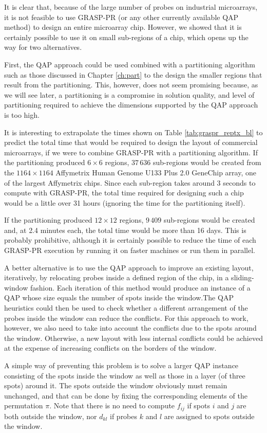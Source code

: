 It is clear that, because of the large number of probes on industrial
microarrays, it is not feasible to use GRASP-PR (or any other currently
available QAP method) to design an entire microarray chip. However, we showed
that it is certainly possible to use it on small sub-regions of a chip, which
opens up the way for two alternatives.

First, the QAP approach could be used combined with a partitioning algorithm
such as those discussed in Chapter \ref{ch:part} to the design the smaller
regions that result from the partitioning. This, however, does not seem
promising because, as we will see later, a partitioning is a compromise in
solution quality, and level of partitioning required to achieve the dimensions
supported by the QAP approach is too high.

It is interesting to extrapolate the times shown on Table
\ref{tab:graspr_reptx_bl} to predict the total time that would be required to
design the layout of commercial microarrays, if we were to combine GRASP-PR with
a partitioning algorithm. If the partitioning produced $6\times 6$ regions,
$37\,636$ sub-regions would be created from the $1164\times 1164$ Affymetrix
Human Genome U133 Plus 2.0 GeneChip array, one of the largest Affymetrix chips.
Since each sub-region takes around 3 seconds to compute with GRASP-PR, the total
time required for designing such a chip would be a little over 31 hours
(ignoring the time for the partitioning itself).

If the partitioning produced $12\times 12$ regions, $9\,409$ sub-regions would
be created and, at 2.4 minutes each, the total time would be more than 16 days.
This is probably prohibitive, although it is certainly possible to reduce the
time of each GRASP-PR execution by running it on faster machines or run them in
parallel.

A better alternative is to use the QAP approach to improve an existing layout,
iteratively, by relocating probes inside a defined region of the chip, in a
sliding-window fashion. Each iteration of this method would produce an instance
of a QAP whose size equals the number of spots inside the window.The QAP
heuristics could then be used to check whether a different arrangement of the
probes inside the window can reduce the conflicts. For this approach to work,
however, we also need to take into account the conflicts due to the spots around
the window. Otherwise, a new layout with less internal conflicts could be
achieved at the expense of increasing conflicts on the borders of the window.

A simple way of preventing this problem is to solve a larger QAP instance
consisting of the spots inside the window as well as those in a layer (of three
spots) around it. The spots outside the window obviously must remain unchanged,
and that can be done by fixing the corresponding elements of the permutation
$\pi$. Note that there is no need to compute $f_{ij}$ if spots $i$ and $j$ are
both outside the window, nor $d_{kl}$ if probes $k$ and $l$ are assigned to
spots outside the window.

